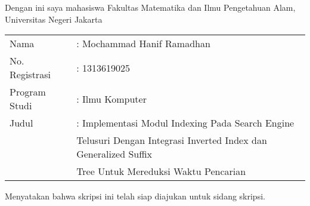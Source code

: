 \chapter*{}
\thispagestyle{empty} {\bf }Dengan ini saya mahasiswa Fakultas
Matematika dan Ilmu Pengetahuan Alam, Universitas Negeri Jakarta

\vskip3mm

\begin{tabular}{ll}
  Nama & : Mochammad Hanif Ramadhan \\
  No. Registrasi & : 1313619025 \\
  Program Studi & : Ilmu Komputer \\
  Judul & : Implementasi Modul Indexing Pada Search Engine \\ & \hspace{0.2cm}
  Telusuri Dengan Integrasi Inverted Index dan Generalized Suffix \\ & \hspace{0.2cm}
  Tree Untuk Mereduksi Waktu Pencarian
\end{tabular}

\vskip3mm

\begin{center}
Menyatakan bahwa skripsi ini telah siap diajukan untuk sidang skripsi.
\end{center}



